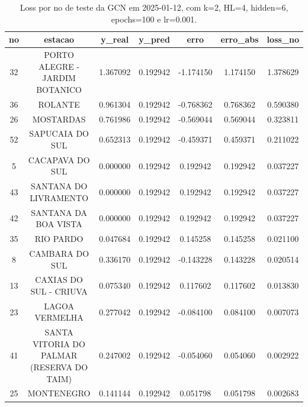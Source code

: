 \begin{table}[h]
\centering
\caption{Loss por no de teste da GCN em 2025-01-12, com k=2, HL=4, hidden=6, epochs=100 e lr=0.001.}
\label{tab:gcn_loss_k2_hl4_h6_e100_d20250112}
\begin{tabular}{ccccccc}
\toprule
no & estacao & y\_real & y\_pred & erro & erro\_abs & loss\_no \\
\midrule
32 & PORTO ALEGRE - JARDIM BOTANICO & 1.367092 & 0.192942 & -1.174150 & 1.174150 & 1.378629 \\
36 & ROLANTE & 0.961304 & 0.192942 & -0.768362 & 0.768362 & 0.590380 \\
26 & MOSTARDAS & 0.761986 & 0.192942 & -0.569044 & 0.569044 & 0.323811 \\
52 & SAPUCAIA DO SUL & 0.652313 & 0.192942 & -0.459371 & 0.459371 & 0.211022 \\
5 & CACAPAVA DO SUL & 0.000000 & 0.192942 & 0.192942 & 0.192942 & 0.037227 \\
43 & SANTANA DO LIVRAMENTO & 0.000000 & 0.192942 & 0.192942 & 0.192942 & 0.037227 \\
42 & SANTANA DA BOA VISTA & 0.000000 & 0.192942 & 0.192942 & 0.192942 & 0.037227 \\
35 & RIO PARDO & 0.047684 & 0.192942 & 0.145258 & 0.145258 & 0.021100 \\
8 & CAMBARA DO SUL & 0.336170 & 0.192942 & -0.143228 & 0.143228 & 0.020514 \\
13 & CAXIAS DO SUL - CRIUVA & 0.075340 & 0.192942 & 0.117602 & 0.117602 & 0.013830 \\
23 & LAGOA VERMELHA & 0.277042 & 0.192942 & -0.084100 & 0.084100 & 0.007073 \\
41 & SANTA VITORIA DO PALMAR (RESERVA DO TAIM) & 0.247002 & 0.192942 & -0.054060 & 0.054060 & 0.002922 \\
25 & MONTENEGRO & 0.141144 & 0.192942 & 0.051798 & 0.051798 & 0.002683 \\
\bottomrule
\end{tabular}
\end{table}
